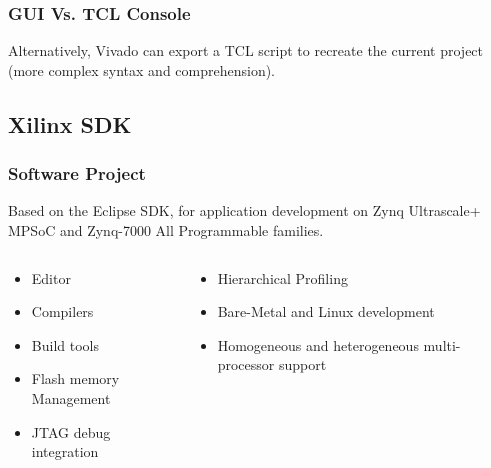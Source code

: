 \begin{frame}
	\frametitle{GUI Vs. TCL Console}
	Alternatively, Vivado can export a TCL script to recreate the current project (more complex syntax and comprehension).
	\vfill
	
\end{frame}

\subsection{Xilinx SDK}

\begin{frame}
	\frametitle{Software Project}
	Based on the Eclipse SDK, for application development on Zynq Ultrascale+ MPSoC and Zynq-7000 All Programmable families.
	\vfill \pause
	\begin{columns}
		\begin{column}{0.5\textwidth}
			\begin{itemize}
				\item Editor
				\item Compilers
				\item Build tools
				\item Flash memory Management
				\item JTAG debug integration
			\end{itemize}
		\end{column}
		\begin{column}{0.5\textwidth}
			\begin{itemize}
				\item Hierarchical Profiling
				\item Bare-Metal and Linux development
				\item Homogeneous and heterogeneous multi-processor support
			\end{itemize}
		\end{column}
	\end{columns}
\end{frame}

